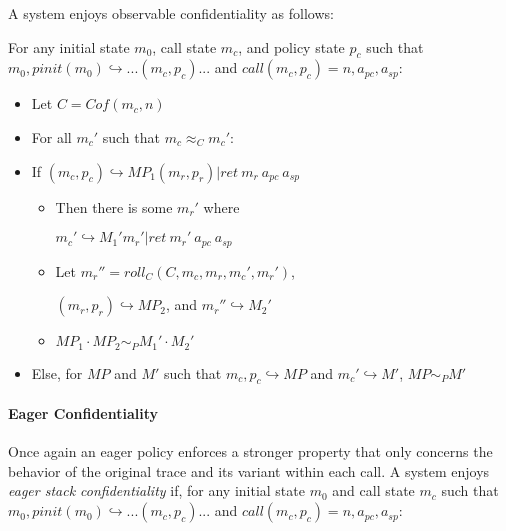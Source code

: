\documentclass[conference]{IEEEtran}
\newcommand{\MP}{\mathit{MP}}
\begin{document}
      A system enjoys observable confidentiality as follows:

      For any initial state \(m_0\), call state \(m_c\), and policy state \(p_c\) such that
      \(m_0,\mathit{pinit}(m_0) \hookrightarrow ... (m_c,p_c) ...\) and
      \(\mathit{call}(m_c,p_c) = n, a_{pc}, a_{sp}\):

      \begin{itemize}
        \item Let \(C = \mathit{Cof}(m_c,n)\)
        \item For all \(m_c'\) such that \(m_c \approx_C m_c'\):
        \item If \((m_c,p_c) \hookrightarrow \MP_1 (m_r,p_r) | \mathit{ret}\ m_r\ a_{pc}\ a_{sp}\)
          \begin{itemize}
            \item Then there is some \(m_r'\) where

              \(m_c' \hookrightarrow M_1' m_r' | \mathit{ret}\ m_r'\ a_{pc}\ a_{sp}\)
            \item Let \(m_r'' = \mathit{roll}_C(C,m_c,m_r,m_c',m_r')\),

              \((m_r,p_r) \hookrightarrow \MP_2\), and \(m_r'' \hookrightarrow M_2'\)
            \item \(\MP_1 \cdot \MP_2 \sim_P M_1' \cdot M_2'\)
          \end{itemize}
        \item Else, for \(\MP\) and \(M'\) such that \(m_c,p_c \hookrightarrow \MP\) and \(m_c' \hookrightarrow M'\),
          \(\MP \sim_P M'\)
      \end{itemize}

    \paragraph{Eager Confidentiality}

      Once again an eager policy enforces a stronger property that only concerns the behavior of
      the original trace and its variant within each call. A system enjoys {\it eager stack
      confidentiality} if, for any initial state \(m_0\) and call state \(m_c\) such that
      \(m_0,\mathit{pinit}(m_0) \hookrightarrow ... (m_c,p_c) ...\) and
      \(\mathit{call}(m_c,p_c) = n, a_{pc}, a_{sp}\):
\end{document}
